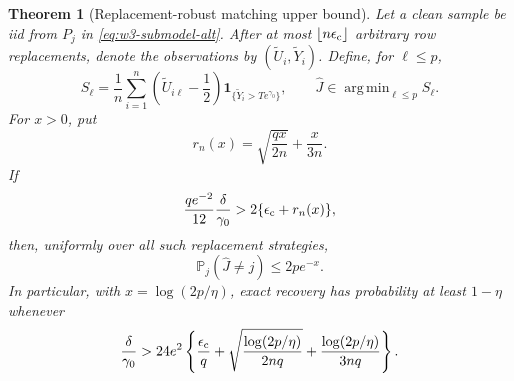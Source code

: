 \documentclass[11pt]{article}
\newtheorem{theorem}{Theorem}[section]
\theoremstyle{remark}
\DeclareMathOperator*{\argmin}{arg\,min}
\newcommand{\Pp}{\mathbb P}
\begin{document}
\begin{theorem}[Replacement-robust matching upper bound]
\label{thm:w3-contam-upper}
Let a clean sample be iid from $P_j$ in
\eqref{eq:w3-submodel-alt}.  After at most
$\lfloor n\epsilon_{\rm c}\rfloor$ arbitrary row replacements, denote the
observations by $(\widetilde U_i,\widetilde Y_i)$.  Define, for
$\ell\le p$,
\begin{equation}
 S_\ell=\frac1n\sum_{i=1}^n
 \left(\widetilde U_{i\ell}-\frac12\right)
 \mathbf 1_{\{\widetilde Y_i>Te^{\gamma_0}\}},
 \qquad
 \widehat J\in\argmin_{\ell\le p}S_\ell.
 \label{eq:w3-robust-stat}
\end{equation}
For $x>0$, put
\begin{equation}
 r_n(x)=\sqrt{\frac{qx}{2n}}+\frac{x}{3n}.
 \label{eq:w3-robust-radius}
\end{equation}
If
\begin{equation}
 \frac{q e^{-2}}{12}\frac{\delta}{\gamma_0}
 >2\{\epsilon_{\rm c}+r_n(x)\},
 \label{eq:w3-robust-signal}
\end{equation}
then, uniformly over all such replacement strategies,
\begin{equation}
 \Pp_j(\widehat J\ne j)\le2pe^{-x}.
 \label{eq:w3-robust-error}
\end{equation}
In particular, with $x=\log(2p/\eta)$, exact recovery has probability at least
$1-\eta$ whenever
\begin{equation}
 \frac{\delta}{\gamma_0}
 >24e^2\left\{
 \frac{\epsilon_{\rm c}}q
 +\sqrt{\frac{\log(2p/\eta)}{2nq}}
 +\frac{\log(2p/\eta)}{3nq}
 \right\}.
 \label{eq:w3-robust-rate}
\end{equation}
\end{theorem}
\end{document}

